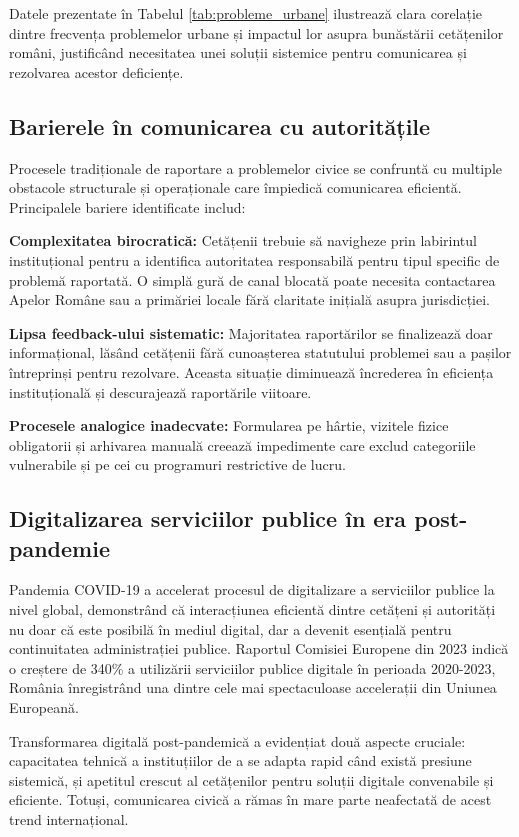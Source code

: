 \documentclass[12pt,a4paper]{report}
\begin{document}
Datele prezentate în Tabelul \ref{tab:probleme_urbane} ilustrează clara corelație dintre frecvența problemelor urbane și impactul lor asupra bunăstării cetățenilor români, justificând necesitatea unei soluții sistemice pentru comunicarea și rezolvarea acestor deficiențe.
\subsection{Barierele în comunicarea cu autoritățile}

Procesele tradiționale de raportare a problemelor civice se confruntă cu multiple obstacole structurale și operaționale care împiedică comunicarea eficientă. Principalele bariere identificate includ:

\textbf{Complexitatea birocratică:} Cetățenii trebuie să navigheze prin labirintul instituțional pentru a identifica autoritatea responsabilă pentru tipul specific de problemă raportată. O simplă gură de canal blocată poate necesita contactarea Apelor Române sau  a primăriei locale fără claritate inițială asupra jurisdicției.

\textbf{Lipsa feedback-ului sistematic:} Majoritatea raportărilor se finalizează doar   informațional, lăsând cetățenii fără cunoașterea statutului problemei sau a pașilor întreprinși pentru rezolvare. Aceasta situație diminuează încrederea în eficiența instituțională și descurajează raportările viitoare.

\textbf{Procesele analogice inadecvate:} Formularea pe hârtie, vizitele fizice obligatorii și arhivarea manuală creează impedimente care exclud categoriile vulnerabile și pe cei cu programuri restrictive de lucru.

\subsection{Digitalizarea serviciilor publice în era post-pandemie}

Pandemia COVID-19 a accelerat procesul de digitalizare a serviciilor publice la nivel global, demonstrând că interacțiunea eficientă dintre cetățeni și autorități nu doar că este posibilă în mediul digital, dar a devenit esențială pentru continuitatea administrației publice. Raportul Comisiei Europene din 2023 indică o creștere de 340\% a utilizării serviciilor publice digitale în perioada 2020-2023, România înregistrând una dintre cele mai spectaculoase accelerații din Uniunea Europeană.

Transformarea digitală post-pandemică a evidențiat două aspecte cruciale: capacitatea tehnică a instituțiilor de a se adapta rapid când există presiune sistemică, și apetitul crescut al cetățenilor pentru soluții digitale convenabile și eficiente. Totuși, comunicarea civică a rămas în mare parte neafectată de acest trend internațional.
\end{document}
